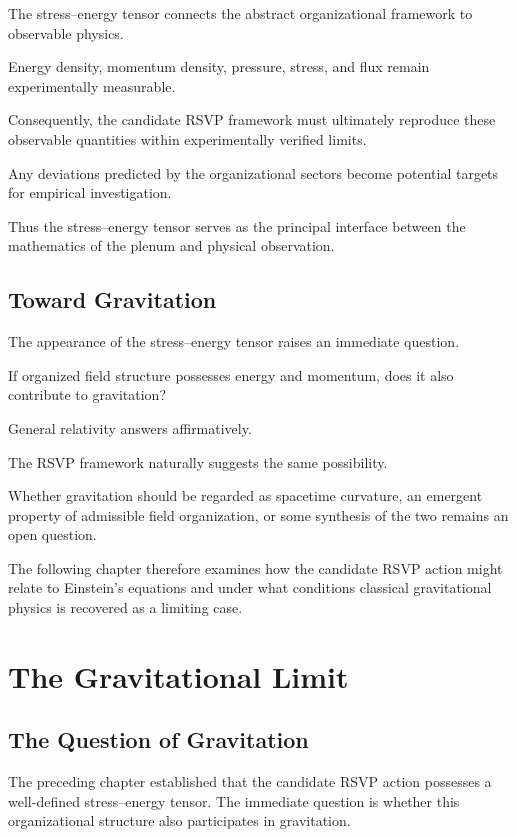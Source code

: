 \documentclass[11pt,oneside]{book}
\numberwithin{equation}{chapter}
\theoremstyle{definition}
\theoremstyle{plain}
\begin{document}
The stress--energy tensor connects the abstract organizational framework to
observable physics.

Energy density, momentum density, pressure, stress, and flux remain
experimentally measurable.

Consequently, the candidate RSVP framework must ultimately reproduce these
observable quantities within experimentally verified limits.

Any deviations predicted by the organizational sectors become potential
targets for empirical investigation.

Thus the stress--energy tensor serves as the principal interface between the
mathematics of the plenum and physical observation.

\section{Toward Gravitation}

The appearance of the stress--energy tensor raises an immediate question.

If organized field structure possesses energy and momentum, does it also
contribute to gravitation?

General relativity answers affirmatively.

The RSVP framework naturally suggests the same possibility.

Whether gravitation should be regarded as spacetime curvature, an emergent
property of admissible field organization, or some synthesis of the two
remains an open question.

The following chapter therefore examines how the candidate RSVP action might
relate to Einstein's equations and under what conditions classical
gravitational physics is recovered as a limiting case.

\chapter{The Gravitational Limit}

\section{The Question of Gravitation}

The preceding chapter established that the candidate RSVP action possesses a
well-defined stress--energy tensor. The immediate question is whether this
organizational structure also participates in gravitation.
\end{document}
